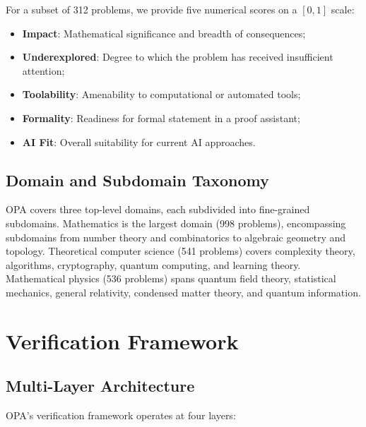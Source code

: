 \documentclass[11pt]{article}
\begin{document}
For a subset of 312 problems, we provide five numerical scores on a $[0, 1]$ scale:

\begin{itemize}  \item \textbf{Impact}: Mathematical significance and breadth of consequences;
  \item \textbf{Underexplored}: Degree to which the problem has received insufficient attention;
  \item \textbf{Toolability}: Amenability to computational or automated tools;
  \item \textbf{Formality}: Readiness for formal statement in a proof assistant;
  \item \textbf{AI Fit}: Overall suitability for current AI approaches.
\end{itemize}

\subsection{Domain and Subdomain Taxonomy}

OPA covers three top-level domains, each subdivided into fine-grained subdomains.
Mathematics is the largest domain (998 problems), encompassing subdomains from number theory and combinatorics to algebraic geometry and topology.
Theoretical computer science (541 problems) covers complexity theory, algorithms, cryptography, quantum computing, and learning theory.
Mathematical physics (536 problems) spans quantum field theory, statistical mechanics, general relativity, condensed matter theory, and quantum information.

\section{Verification Framework}
\label{sec:verification}

\subsection{Multi-Layer Architecture}

OPA's verification framework operates at four layers:
\end{document}
